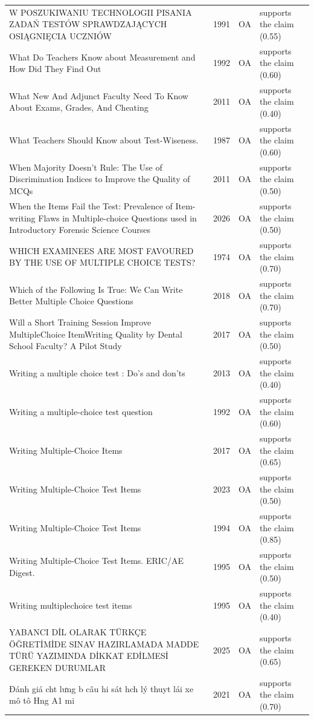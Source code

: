 \begin{longtable}{@{}%
  >{\raggedright\arraybackslash}p{}c%
  >{\raggedright\arraybackslash}p{}%
  >{\raggedright\arraybackslash}p{}@{}}
W POSZUKIWANIU TECHNOLOGII PISANIA ZADAŃ TESTÓW SPRAWDZAJĄCYCH OSIĄGNIĘCIA UCZNIÓW & 1991 & OA & supports the claim (0.55) \\
What Do Teachers Know about Measurement and How Did They Find Out & 1992 & OA & supports the claim (0.60) \\
What New And Adjunct Faculty Need To Know About Exams, Grades, And Cheating & 2011 & OA & supports the claim (0.40) \\
What Teachers Should Know about Test-Wiseness. & 1987 & OA & supports the claim (0.60) \\
When Majority Doesn't Rule: The Use of Discrimination Indices to Improve the Quality of MCQs & 2011 & OA & supports the claim (0.50) \\
When the Items Fail the Test: Prevalence of Item-writing Flaws in Multiple-choice Questions used in Introductory Forensic Science Courses & 2026 & OA & supports the claim (0.50) \\
WHICH EXAMINEES ARE MOST FAVOURED BY THE USE OF MULTIPLE CHOICE TESTS? & 1974 & OA & supports the claim (0.70) \\
Which of the Following Is True: We Can Write Better Multiple Choice Questions & 2018 & OA & supports the claim (0.70) \\
Will a Short Training Session Improve MultipleChoice ItemWriting Quality by Dental School Faculty? A Pilot Study & 2017 & OA & supports the claim (0.50) \\
Writing a multiple choice test : Do's and don'ts & 2013 & OA & supports the claim (0.40) \\
Writing a multiple-choice test question & 1992 & OA & supports the claim (0.60) \\
Writing Multiple-Choice Items & 2017 & OA & supports the claim (0.65) \\
Writing Multiple-Choice Test Items & 2023 & OA & supports the claim (0.50) \\
Writing Multiple-Choice Test Items & 1994 & OA & supports the claim (0.85) \\
Writing Multiple-Choice Test Items. ERIC/AE Digest. & 1995 & OA & supports the claim (0.50) \\
Writing multiplechoice test items & 1995 & OA & supports the claim (0.40) \\
YABANCI DİL OLARAK TÜRKÇE ÖĞRETİMİDE SINAV HAZIRLAMADA MADDE TÜRÜ YAZIMINDA DİKKAT EDİLMESİ GEREKEN DURUMLAR & 2025 & OA & supports the claim (0.65) \\
Đánh giá cht lưng b câu hi sát hch lý thuyt lái xe mô tô Hng A1 mi & 2021 & OA & supports the claim (0.70) \\

\end{longtable}
